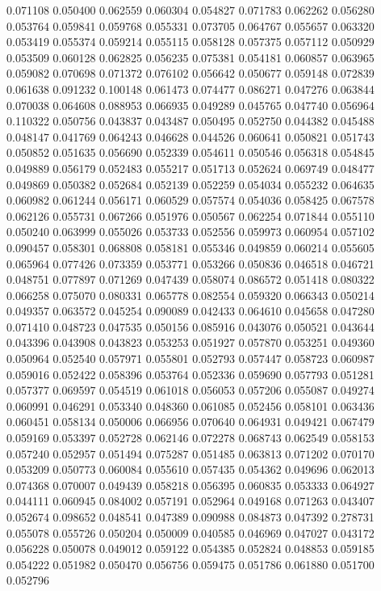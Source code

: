 0.071108
0.050400
0.062559
0.060304
0.054827
0.071783
0.062262
0.056280
0.053764
0.059841
0.059768
0.055331
0.073705
0.064767
0.055657
0.063320
0.053419
0.055374
0.059214
0.055115
0.058128
0.057375
0.057112
0.050929
0.053509
0.060128
0.062825
0.056235
0.075381
0.054181
0.060857
0.063965
0.059082
0.070698
0.071372
0.076102
0.056642
0.050677
0.059148
0.072839
0.061638
0.091232
0.100148
0.061473
0.074477
0.086271
0.047276
0.063844
0.070038
0.064608
0.088953
0.066935
0.049289
0.045765
0.047740
0.056964
0.110322
0.050756
0.043837
0.043487
0.050495
0.052750
0.044382
0.045488
0.048147
0.041769
0.064243
0.046628
0.044526
0.060641
0.050821
0.051743
0.050852
0.051635
0.056690
0.052339
0.054611
0.050546
0.056318
0.054845
0.049889
0.056179
0.052483
0.055217
0.051713
0.052624
0.069749
0.048477
0.049869
0.050382
0.052684
0.052139
0.052259
0.054034
0.055232
0.064635
0.060982
0.061244
0.056171
0.060529
0.057574
0.054036
0.058425
0.067578
0.062126
0.055731
0.067266
0.051976
0.050567
0.062254
0.071844
0.055110
0.050240
0.063999
0.055026
0.053733
0.052556
0.059973
0.060954
0.057102
0.090457
0.058301
0.068808
0.058181
0.055346
0.049859
0.060214
0.055605
0.065964
0.077426
0.073359
0.053771
0.053266
0.050836
0.046518
0.046721
0.048751
0.077897
0.071269
0.047439
0.058074
0.086572
0.051418
0.080322
0.066258
0.075070
0.080331
0.065778
0.082554
0.059320
0.066343
0.050214
0.049357
0.063572
0.045254
0.090089
0.042433
0.064610
0.045658
0.047280
0.071410
0.048723
0.047535
0.050156
0.085916
0.043076
0.050521
0.043644
0.043396
0.043908
0.043823
0.053253
0.051927
0.057870
0.053251
0.049360
0.050964
0.052540
0.057971
0.055801
0.052793
0.057447
0.058723
0.060987
0.059016
0.052422
0.058396
0.053764
0.052336
0.059690
0.057793
0.051281
0.057377
0.069597
0.054519
0.061018
0.056053
0.057206
0.055087
0.049274
0.060991
0.046291
0.053340
0.048360
0.061085
0.052456
0.058101
0.063436
0.060451
0.058134
0.050006
0.066956
0.070640
0.064931
0.049421
0.067479
0.059169
0.053397
0.052728
0.062146
0.072278
0.068743
0.062549
0.058153
0.057240
0.052957
0.051494
0.075287
0.051485
0.063813
0.071202
0.070170
0.053209
0.050773
0.060084
0.055610
0.057435
0.054362
0.049696
0.062013
0.074368
0.070007
0.049439
0.058218
0.056395
0.060835
0.053333
0.064927
0.044111
0.060945
0.084002
0.057191
0.052964
0.049168
0.071263
0.043407
0.052674
0.098652
0.048541
0.047389
0.090988
0.084873
0.047392
0.278731
0.055078
0.055726
0.050204
0.050009
0.040585
0.046969
0.047027
0.043172
0.056228
0.050078
0.049012
0.059122
0.054385
0.052824
0.048853
0.059185
0.054222
0.051982
0.050470
0.056756
0.059475
0.051786
0.061880
0.051700
0.052796
